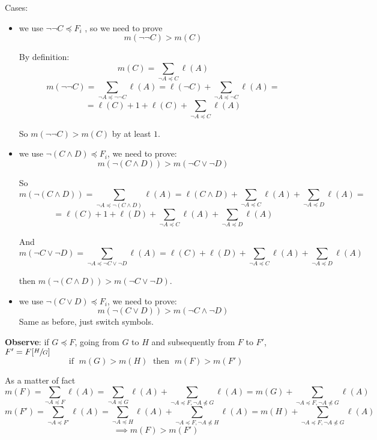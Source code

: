 	Cases:
	\begin{itemize}
		\item we use $\neg \neg C \preceq F_i$ , so we need to prove
		$$ m(\neg \neg C) > m(C) $$

		By definition:
		$$ m(C) = \sum_{\neg A \preceq C} \ell(A) $$
		$$ m(\neg \neg C) = \sum_{\neg A \preceq \neg \neg C} \ell(A) = \ell (\neg C) + \sum_{\neg A \preceq \neg C} \ell (A) =$$
		$$ = \ell (C) + 1 + \ell (C) + \sum_{\neg A \preceq C} \ell (A) $$

		So $m(\neg \neg C) > m(C)$ by at least $1$.\\

		\newpage

		\item we use $\neg (C \wedge D) \preceq F_i$, we need to prove:
		$$ m(\neg (C \wedge D)) > m(\neg C \vee \neg D) $$

		So
		$$ m(\neg (C \wedge D)) = \sum_{\neg A \preceq \neg (C \wedge D)} \ell(A) = \ell (C \wedge D) + \sum_{\neg A \preceq C} \ell(A) + \sum_{\neg A \preceq D} \ell(A) = $$
		$$ = \ell (C) + 1 + \ell (D) + \sum_{\neg A \preceq C} \ell(A) + \sum_{\neg A \preceq D} \ell(A) $$

		And
		$$ m(\neg C \vee \neg D) = \sum_{\neg A \preceq \neg C \vee \neg D} \ell (A) = \ell (C) + \ell(D) + \sum_{\neg A \preceq C} \ell(A) + \sum_{\neg A \preceq D} \ell(A) $$

		then $m(\neg (C \wedge D)) > m(\neg C \vee \neg D)$.\\

		\item we use $\neg (C \vee D) \preceq F_i$, we need to prove:
		$$ m(\neg (C \vee D)) > m(\neg C \wedge \neg D) $$
		Same as before, just switch symbols.\\

	\end{itemize}

	\textbf{Observe}: if $G \preceq F$, going from $G$ to $H$ and subsequently from $F$ to $F'$, $F' = F[\sfrac{H}{G}]$
	$$ \text{if } \; m (G) > m(H) \; \text{ then } \; m(F) > m(F')$$

	As a matter of fact
	$$m(F) = \sum_{\neg A \preceq F} \ell(A) = \sum_{\neg A \preceq G} \ell(A) + \sum_{\neg A \preceq F, \neg A \not \preceq G} \ell (A)  = m(G) + \sum_{\neg A \preceq F, \neg A \not \preceq G} \ell (A) $$
	$$ m(F') = \sum_{\neg A \preceq F'} \ell(A) = \sum_{\neg A \preceq H} \ell(A) + \sum_{\neg A \preceq F, \neg A \not \preceq H} \ell (A)  = m(H) + \sum_{\neg A \preceq F, \neg A \not \preceq G} \ell (A)$$
	$$ \implies m(F) > m(F') $$

